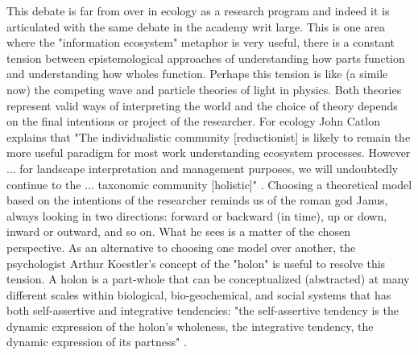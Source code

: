 This debate is far from over in ecology as a research program and indeed it is articulated with the same debate in the academy writ large. This is one area where the "information ecosystem" metaphor is very useful, there is a constant tension between epistemological approaches of understanding how  parts function and understanding how wholes function. Perhaps this tension is like (a simile now) the competing wave and particle theories of light in physics. Both theories represent valid ways of interpreting the world and the choice of theory depends on the final intentions or project of the researcher. For ecology John Catlon explains that "The individualistic community [reductionist] is likely to remain the more useful paradigm for most work understanding ecosystem processes. However ... for landscape interpretation and management purposes, we will undoubtedly continue to the ... taxonomic community [holistic]" \cite[Cantlon 1996 cited in ][p. 241]{barbour_1996}. Choosing a theoretical model based on the intentions of the researcher reminds us of the roman god Janus, always looking in two directions: forward or backward (in time), up or down, inward or outward, and so on. What he sees is a matter of the chosen perspective. As an alternative to choosing one model over another, the psychologist Arthur Koestler's concept of the "holon" is useful to resolve this tension. A holon is a part-whole that can be conceptualized (abstracted) at many different scales within biological, bio-geochemical, and social systems that has both self-assertive and integrative tendencies: "the self-assertive tendency is the dynamic expression of the holon's wholeness, the integrative tendency, the dynamic expression of its partness" \cite[][p. 56] {koestler_1967}.

